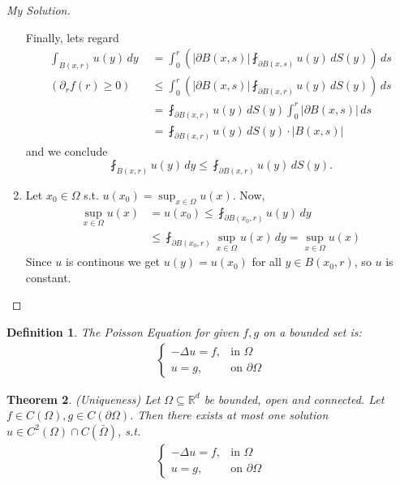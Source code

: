 \documentclass{report}
\theoremstyle{tommy}
\newtheorem{defn}{Definition}
\newtheorem{thm}[defn]{Theorem}
\begin{document}
\begin{proof}[My Solution]
\begin{enumerate}[label=\alph*)]
        Finally, lets regard
        \begin{align*}
          \int_{B(x, r)} u(y) \, dy
          &= \int_0^r \left(|\partial B(x,s)| \fint_{\partial B(x, s)} u(y) \, dS(y)\right) \, ds \\
          (\partial_r f(r) \ge 0) \quad &\le \int_0^r \left(|\partial B(x,s)| \fint_{\partial B(x, r)} u(y) \, dS(y)\right) \, ds \\
          &= \fint_{\partial B(x, r)} u(y)  \, dS(y) \int_0^r |\partial B(x,s)| \, ds \\
          &= \fint_{\partial B(x, r)} u(y)  \, dS(y) \cdot |B(x,s)|
        \end{align*}
        and we conclude
        \[\fint_{B(x, r)} u(y) \, dy \le \fint_{\partial B(x,r)} u(y) \, dS(y).\]
      \item Let \(x_0 \in \Omega\) s.t. \(u(x_0) = \sup_{x \in \Omega} u(x)\). Now, \begin{align*}
        \sup_{x \in \Omega} u(x) 
        &= u(x_0) 
        \le \fint_{\partial B(x_0, r)} u(y) \, dy \\
        &\le \fint_{\partial B(x_0, r)} \sup_{x \in \Omega} u(x) \, dy 
        = \sup_{x \in \Omega} u(x)
      \end{align*}
      Since \(u\) is continous we get \(u(y) = u(x_0)\) for all \(y \in B(x_0, r)\), so \(u\) is constant. \qedhere
    \end{enumerate}
  \end{proof}

  \begin{defn}
    The \emph{Poisson Equation} for given \(f, g\) on a bounded set is:
    \begin{align*}
      \begin{cases}
        - \Delta u = f, &\text{in } \Omega \\
        u = g, &\text{on } \partial \Omega
      \end{cases}
    \end{align*} 
  \end{defn}

  \begin{thm}(Uniqueness)
    Let \(\Omega \subseteq \mathbb{R}^d\) be bounded, open  and connected. Let \(f \in C(\Omega), g \in C(\partial \Omega)\). Then there exists \emph{at most} one solution \(u \in C^2(\Omega) \cap C(\bar \Omega)\), s.t. \begin{align*}
      \begin{cases}
        - \Delta u = f, &\text{in } \Omega \\
        u = g, &\text{on } \partial \Omega
      \end{cases}
    \end{align*}
  \end{thm}
\end{document}
